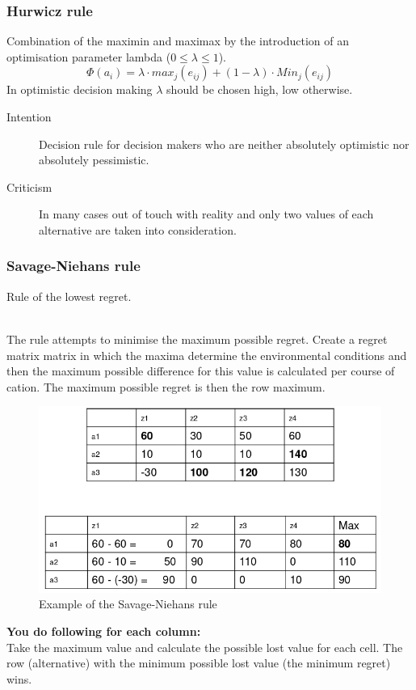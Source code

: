\subsubsection{Hurwicz rule}

Combination of the maximin and maximax by the introduction of an
optimisation parameter lambda ($0 \le \lambda \le 1$).
\begin{equation}
\Phi(a_i) = \lambda \cdot max_j(e_{ij}) + (1-\lambda) \cdot Min_j(e_{ij})
\end{equation}
In optimistic decision making $\lambda$ should be chosen high, low otherwise.

\begin{description}
	\item[Intention] Decision rule for decision makers who are neither
	absolutely optimistic nor absolutely pessimistic.
	\item[Criticism] In	many cases out of touch with reality and only two
	values of each alternative are taken into consideration.
\end{description}


\subsubsection{Savage-Niehans rule}

Rule of the lowest regret.

\mbox{}\\
The rule attempts to minimise the maximum possible regret. Create a
regret matrix matrix in which the maxima determine the environmental
conditions and then the maximum possible difference for this value is
calculated per course of cation. The maximum possible regret is then the
row maximum.

\begin{figure}[H]
	\centering
	\includegraphics[width=.6\textwidth]{figures/savage-niehansRule.png}
	\caption{Example of the Savage-Niehans rule}
	\label{fig:savageniehans-rule}
\end{figure}

\textbf{You do following for each column:}\\
Take the maximum value and calculate the possible lost
value for each cell. The row (alternative) with the minimum possible
lost value (the minimum regret) wins.

